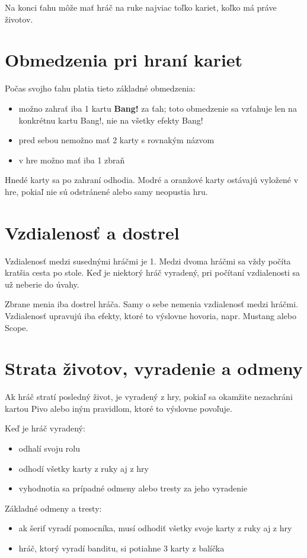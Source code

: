 Na konci ťahu môže mať hráč na ruke najviac toľko kariet, koľko má práve životov.

\section*{Obmedzenia pri hraní kariet}
Počas svojho ťahu platia tieto základné obmedzenia:
\begin{itemize}
    \item možno zahrať iba 1 kartu \textbf{Bang!} za ťah; toto obmedzenie sa vzťahuje len na konkrétnu kartu Bang!, nie na všetky efekty Bang!
    \item pred sebou nemožno mať 2 karty s rovnakým názvom
    \item v hre možno mať iba 1 zbraň
\end{itemize}

Hnedé karty sa po zahraní odhodia. Modré a oranžové karty ostávajú vyložené v hre, pokiaľ nie sú odstránené alebo samy neopustia hru.

\section*{Vzdialenosť a dostrel}
Vzdialenosť medzi susednými hráčmi je 1. Medzi dvoma hráčmi sa vždy počíta kratšia cesta po stole. Keď je niektorý hráč vyradený, pri počítaní vzdialenosti sa už neberie do úvahy.

Zbrane menia iba dostrel hráča. Samy o sebe nemenia vzdialenosť medzi hráčmi. Vzdialenosť upravujú iba efekty, ktoré to výslovne hovoria, napr. Mustang alebo Scope.

\section*{Strata životov, vyradenie a odmeny}
Ak hráč stratí posledný život, je vyradený z hry, pokiaľ sa okamžite nezachráni kartou Pivo alebo iným pravidlom, ktoré to výslovne povoľuje.

Keď je hráč vyradený:
\begin{itemize}
    \item odhalí svoju rolu
    \item odhodí všetky karty z ruky aj z hry
    \item vyhodnotia sa prípadné odmeny alebo tresty za jeho vyradenie
\end{itemize}

Základné odmeny a tresty:
\begin{itemize}
    \item ak šerif vyradí pomocníka, musí odhodiť všetky svoje karty z ruky aj z hry
    \item hráč, ktorý vyradí banditu, si potiahne 3 karty z balíčka
\end{itemize}

